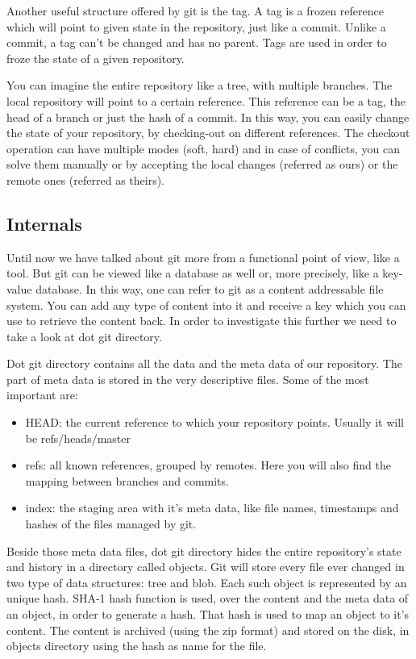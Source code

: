         Another useful structure offered by git is the tag. A tag is a frozen reference which will point to given state in the repository, just like a commit. Unlike a commit, a tag can't be changed and has no parent. Tags are used in order to froze the state of a given repository.

        You can imagine the entire repository like a tree, with multiple branches. The local repository will point to a certain reference. This reference can be a tag, the head of a branch or just the hash of a commit. In this way, you can easily change the state of your repository, by checking-out on different references. The checkout operation can have multiple modes (soft, hard) and in case of conflicts, you can solve them manually or by accepting the local changes (referred as ours) or the remote ones (referred as theirs).

    \subsection{Internals}
        Until now we have talked about git more from a functional point of view, like a tool. But git can be viewed like a database as well or, more precisely, like a key-value database. In this way, one can refer to git as a content addressable file system. You can add any type of content into it and receive a key which you can use to retrieve the content back. In order to investigate this further we need to take a look at dot git directory.

        Dot git directory contains all the data and the meta data of our repository. The part of meta data is stored in the very descriptive files. Some of the most important are:

        \begin{itemize}
            \item HEAD: the current reference to which your repository points. Usually it will be refs/heads/master
            \item refs: all known references, grouped by remotes. Here you will also find the mapping between branches and commits.
            \item index: the staging area with it's meta data, like file names, timestamps and hashes of the files managed by git.
        \end{itemize}

        Beside those meta data files, dot git directory hides the entire repository's state and history in a directory called objects. Git will store every file ever changed in two type of data structures: tree and blob. Each such object is represented by an unique hash. SHA-1 hash function is used, over the content and the meta data of an object, in order to generate a hash. That hash is used to map an object to it's content. The content is archived (using the zip format) and stored on the disk, in objects directory using the hash as name for the file.

